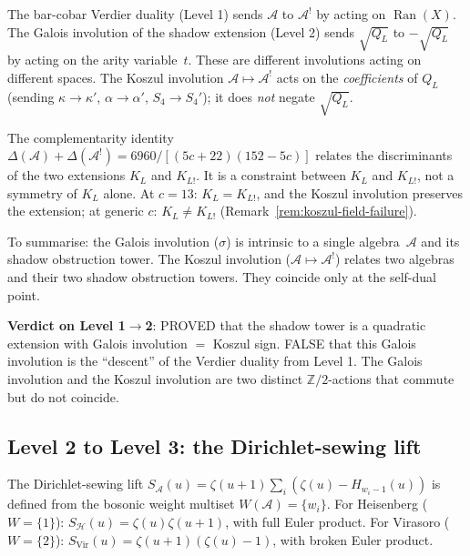 \documentclass[11pt]{article}
\newcommand{\cA}{\mathcal{A}}
\newcommand{\cH}{\mathcal{H}}
\newcommand{\Z}{\mathbb{Z}}
\newcommand{\Ran}{\operatorname{Ran}}
\begin{document}
\begin{warning}
\label{warn:two-involutions}
The bar-cobar Verdier duality (Level 1) sends $\cA$ to
$\cA^!$ by acting on $\Ran(X)$.  The Galois involution of the
shadow extension (Level 2) sends $\sqrt{Q_L}$ to $-\sqrt{Q_L}$
by acting on the arity variable~$t$.  These are different
involutions acting on different spaces.  The Koszul involution
$\cA \mapsto \cA^!$ acts on the \emph{coefficients} of $Q_L$
(sending $\kappa \to \kappa'$, $\alpha \to \alpha'$,
$S_4 \to S_4'$); it does \emph{not} negate $\sqrt{Q_L}$.

The complementarity identity
$\Delta(\cA) + \Delta(\cA^!) = 6960/[(5c{+}22)(152{-}5c)]$
relates the discriminants of the two extensions $K_L$ and
$K_{L!}$.  It is a constraint between $K_L$ and $K_{L!}$,
not a symmetry of $K_L$ alone.  At $c = 13$: $K_L = K_{L!}$,
and the Koszul involution preserves the extension; at generic
$c$: $K_L \neq K_{L!}$ (Remark~\ref{rem:koszul-field-failure}).

To summarise: the Galois involution ($\sigma$) is intrinsic
to a single algebra~$\cA$ and its shadow obstruction tower.  The Koszul
involution ($\cA \mapsto \cA^!$) relates two algebras and their
two shadow obstruction towers.  They coincide only at the self-dual point.
\end{warning}

\textbf{Verdict on Level 1$\to$2}: PROVED that the shadow
tower is a quadratic extension with Galois involution $= $ Koszul
sign.  FALSE that this Galois involution is the ``descent'' of
the Verdier duality from Level 1.  The Galois involution and the
Koszul involution are two distinct $\Z/2$-actions that commute
but do not coincide.

\subsection{Level 2 to Level 3: the Dirichlet-sewing lift}

The Dirichlet-sewing lift $S_\cA(u) = \zeta(u{+}1)\sum_i
(\zeta(u) - H_{w_i - 1}(u))$ is defined from the bosonic weight
multiset $W(\cA) = \{w_i\}$.  For Heisenberg ($W = \{1\}$):
$S_\cH(u) = \zeta(u)\zeta(u{+}1)$, with full Euler product.
For Virasoro ($W = \{2\}$):
$S_{\mathrm{Vir}}(u) = \zeta(u{+}1)(\zeta(u) - 1)$,
with broken Euler product.
\end{document}
